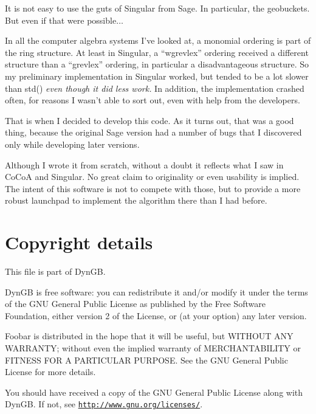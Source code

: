 \begin{DoxyItemize}
\item It is not easy to use the guts of Singular from Sage. In particular, the geobuckets. But even if that were possible{$\dots$} \item In all the computer algebra systems I've looked at, a monomial ordering is part of the ring structure. At least in Singular, a ``wgrevlex'' ordering received a different structure than a ``grevlex'' ordering, in particular a disadvantageous structure. So my preliminary implementation in Singular worked, but tended to be a lot slower than {\ttfamily std()} {\itshape even though it did less work.} In addition, the implementation crashed often, for reasons I wasn't able to sort out, even with help from the developers.\end{DoxyItemize}
That is when I decided to develop this code. As it turns out, that was a good thing, because the original Sage version had a number of bugs that I discovered only while developing later versions.

Although I wrote it from scratch, without a doubt it reflects what I saw in Co\+CoA and Singular. No great claim to originality or even usability is implied. The intent of this software is not to compete with those, but to provide a more robust launchpad to implement the algorithm there than I had before.\hypertarget{index_Copyright}{}\section{Copyright details}\label{index_Copyright}
This file is part of Dyn\+GB.

Dyn\+GB is free software\+: you can redistribute it and/or modify it under the terms of the G\+NU General Public License as published by the Free Software Foundation, either version 2 of the License, or (at your option) any later version.

Foobar is distributed in the hope that it will be useful, but W\+I\+T\+H\+O\+UT A\+NY W\+A\+R\+R\+A\+N\+TY; without even the implied warranty of M\+E\+R\+C\+H\+A\+N\+T\+A\+B\+I\+L\+I\+TY or F\+I\+T\+N\+E\+SS F\+OR A P\+A\+R\+T\+I\+C\+U\+L\+AR P\+U\+R\+P\+O\+SE. See the G\+NU General Public License for more details.

You should have received a copy of the G\+NU General Public License along with Dyn\+GB. If not, see \href{http://www.gnu.org/licenses/}{\tt http\+://www.\+gnu.\+org/licenses/}. 